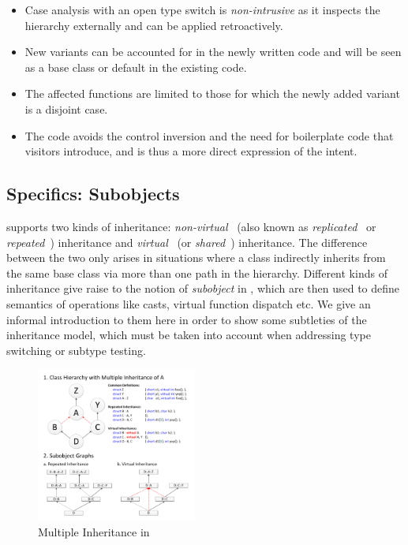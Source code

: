 \begin{itemize}
\setlength{\itemsep}{0pt}
\setlength{\parskip}{0pt}
\item Case analysis with an open type switch is \emph{non-intrusive} as it 
      inspects the hierarchy externally and can be applied retroactively. 
\item New variants can be accounted for in the newly written code and will be 
      seen as a base class or default in the existing code.
\item The affected functions are limited to those for which the newly added 
      variant is a disjoint case.
\item The code avoids the control inversion and the need for boilerplate code 
      that visitors introduce, and is thus a more direct expression of the 
      intent.
\end{itemize}

\subsection{\Cpp{} Specifics: Subobjects}
\label{sec:specifics}

\Cpp{} supports two kinds of inheritance: \emph{non-virtual}~\cite{CPPARM90} (also 
known as \emph{replicated}~\cite{RF95} or \emph{repeated}~\cite{WNST06}) 
inheritance and \emph{virtual}~\cite{CPPARM90} (or \emph{shared}~\cite{WNST06}) 
inheritance. The difference between the two only arises in situations where a 
class indirectly inherits from the same base class via more than one path in the 
hierarchy. Different kinds of inheritance give raise to the notion of 
\emph{subobject} in \Cpp{}, which are then used to define semantics of operations 
like casts, virtual function dispatch etc. We give an informal introduction to 
them here in order to show some subtleties of the \Cpp{} inheritance model, which 
must be taken into account when addressing type switching or subtype testing.

\begin{figure}[htbp]
  \centering
    \includegraphics[width=0.47\textwidth]{Inheritance.pdf}
  \caption{Multiple Inheritance in \Cpp{}}
  \label{fig:inheritance}
\end{figure}

